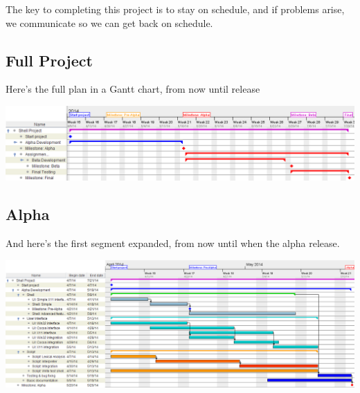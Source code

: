 \documentclass[a4paper,12pt]{article}
\begin{document}
The key to completing this project is to stay on schedule, and if problems arise, we communicate so we can get back on schedule.

\subsection*{Full Project}
Here's the full plan in a Gantt chart, from now until release
\begin{center}
  \includegraphics[width=16cm]{full.png}\\
\end{center}

\subsection*{Alpha}
And here's the first segment expanded, from now until when the alpha release.
\begin{center}
  \includegraphics[width=16cm]{alpha.png}\\
\end{center}
\end{document}
